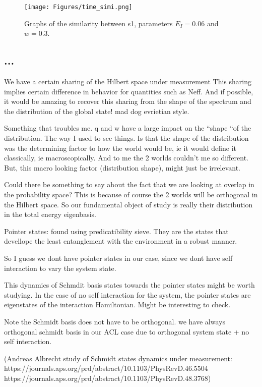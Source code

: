 \documentclass{article}
\begin{document}
\begin{figure}
    \centering
    \texttt{[image: Figures/time\_simi.png]}
    \caption{Graphs of the similarity between s1, parameters $E_I=0.06$ and $w=0.3$.}
    \label{fig:time_simi}
\end{figure}

\subsection{...}

We have a certain sharing of the Hilbert space under measurement
This sharing implies certain difference in behavior for quantities such as Neff. And if possible, it would be amazing to recover this sharing from the shape of the spectrum and the distribution of the global state!  mad dog evrietian style.

Something that troubles me. q and w have a large impact on the  “shape “of the distribution. The way I used to see things. Is that the shape of the distribution was the determining factor to how the world would be, ie it would define it classically, ie macroscopically. And to me the 2 worlds couldn’t me so different. But, this macro looking factor (distribution shape), might just be irrelevant.  

Could there be something to say about the fact that we are looking at overlap in the probability space? This is because of course the 2 worlds will be orthogonal in the Hilbert space. 
So our fundamental object of study is really their distribution in the total energy eigenbasis.



Pointer states: found using predicatibility sieve. They are the states that devellope the least entanglement with the environment in a robust manner.

So I guess we dont have pointer states in our case, since we dont have self interaction to vary the system state.

This dynamics of Schmdit basis states towards the pointer states might be worth studying. In the case of no self interaction for the system, the pointer states are eigenstates of the interaction Hamiltonian. Might be interesting to check.

Note the Schmidt basis does not have to be orthogonal.  
we have always orthogonal schmidt basis in our ACL case due to orthogonal system state + no self interaction.

(Andreas Albrecht study of Schmidt states dynamics under measurement:
https://journals.aps.org/prd/abstract/10.1103/PhysRevD.46.5504
https://journals.aps.org/prd/abstract/10.1103/PhysRevD.48.3768)
\end{document}
